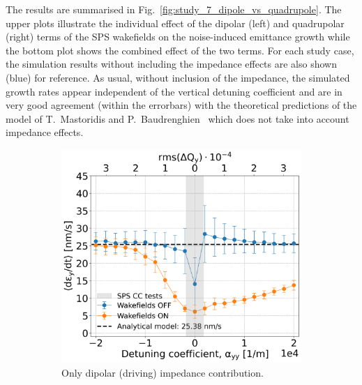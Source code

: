 The results are summarised in Fig.~\ref{fig:study_7_dipole_vs_quadrupole}. The upper plots illustrate the individual effect of the dipolar (left) and quadrupolar (right) terms of the SPS wakefields on the noise-induced emittance growth while the bottom plot shows the combined effect of the two terms. For each study case, the simulation results without including the impedance effects are also shown (blue) for reference. As usual, without inclusion of the impedance, the simulated growth rates appear independent of the vertical detuning coefficient and are in very good agreement (within the errorbars) with the theoretical predictions of the model of T.~Mastoridis and P.~Baudrenghien~\cite{PhysRevSTAB.18.101001} which does not take into account impedance effects.

\begin{figure}[htp]
    \centering
    \begin{subfigure}{.45\textwidth}
        \centering
        \includegraphics[width=.95\linewidth]{images/Ch7/dipolar_impedance.png}  
        \caption{Only dipolar (driving) impedance contribution.}
        \label{fig:study_7_dipole}
    \end{subfigure}
    \begin{subfigure}{.45\textwidth}
        \centering

\end{subfigure}
\end{figure}
